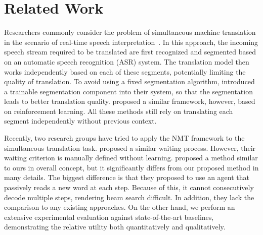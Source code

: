 \section{Related Work}
Researchers commonly consider the problem of simultaneous machine translation in the scenario of real-time speech interpretation~\cite{fugen2007simultaneous,bangalore2012real,fujita2013simple,sridhar2013segmentation,yarmohammadi2013incremental}. In  this approach, the incoming speech stream required to be translated are first recognized and segmented based on an automatic speech recognition (ASR) system. The translation model then works independently based on each of these segments, potentially limiting the quality of translation. %
To avoid using a fixed segmentation algorithm, \citep{oda-EtAl:2014:P14-2} introduced a trainable segmentation component into their system, so that the segmentation leads to better translation quality. \citep{grissomii2014don} proposed a similar framework, however, based on reinforcement learning. All these methods still rely on translating each segment independently without previous context.

Recently, two research groups have tried to apply the NMT framework to the simultaneous translation task. \citep{cho2016can} proposed a similar waiting process. However, their waiting criterion is manually defined without learning. \citep{satija2016simultaneous} proposed a method similar to ours in overall concept, but it significantly differs from our proposed method in many details. The biggest difference is  that they proposed to use an agent that passively reads a new word at each step. Because of this, it cannot consecutively decode multiple steps, rendering beam search difficult. In addition, they lack the comparison to any existing approaches. On the other hand, we perform an extensive experimental evaluation against state-of-the-art baselines, demonstrating the relative utility both quantitatively and qualitatively.

